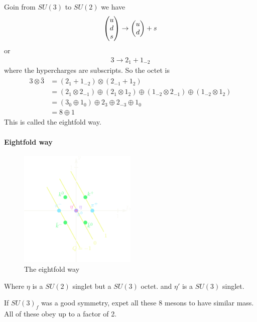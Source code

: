 \documentclass[../main.tex]{subfiles}
\begin{document}
Goin from $SU(3)$ to $SU(2)$ we have
\begin{align*}
    \mqty(u \\ d \\ s) \to \mqty(u \\ d) + s
\end{align*}
or
\begin{align*}
    3 \to 2_1 + 1_{-2}
\end{align*}
where the hypercharges are subscripts. So the octet is
\begin{align*}
    3 \otimes \bar 3 &= (2_1 + 1_{-2}) \otimes (2_{-1} + 1_2) \\
    &= (2_1 \otimes 2_{-1}) \oplus (2_1 \otimes 1_2)
        \oplus (1_{-2} \otimes 2_{-1}) \oplus (1_{-2} \otimes 1_2) \\
    &= (3_0 \oplus 1_0) \oplus 2_3 \oplus 2_{-3} \oplus 1_0 \\
    &= 8 \oplus 1
\end{align*}
This is called the eightfold way.
\paragraph*{Eightfold way}
\begin{figure}[ht]
    \centering
    \includegraphics[width=0.5\textwidth]{mesons.png}
    \caption{The eightfold way}
    \label{fig:eightfold_way}
\end{figure}
Where $\eta$ is a $SU(2)$ singlet but a $SU(3)$ octet. and $\eta'$ is a $SU(3)$ singlet.

If $SU(3)_f$ was a good symmetry, expet all these 8 mesons to have similar mass. All of these obey
up to a factor of 2.
\end{document}
